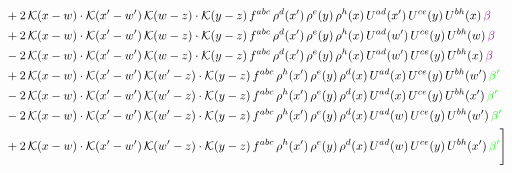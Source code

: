 \documentclass[9pt]{article}
\numberwithin{equation}{section}
\begin{document}
\begin{align}
&+2\,\mathcal{K}(x-w)\cdot\mathcal{K}(x'-w')\,\mathcal{K}(w-z)\cdot\mathcal{K}(y-z)\, f^{abc}\,\rho^{d}(x')\,\rho^{e}(y)\,\rho^{h}(x)\,U^{ad}(x')\,U^{ce}(y)\,U^{bh}(x)\,{\color{violet} \beta}\notag \\ & +2\,\mathcal{K}(x-w)\cdot\mathcal{K}(x'-w')\,\mathcal{K}(w-z)\cdot\mathcal{K}(y-z)\, f^{abc}\,\rho^{d}(x')\,\rho^{e}(y)\,\rho^{h}(x)\,U^{ad}(w')\,U^{ce}(y)\,U^{bh}(w)\,{\color{violet} \beta} \notag\\ & -2\,\mathcal{K}(x-w)\cdot\mathcal{K}(x'-w')\,\mathcal{K}(w-z)\cdot\mathcal{K}(y-z)\, f^{abc}\,\rho^{d}(x')\,\rho^{e}(y)\,\rho^{h}(x)\,U^{ad}(w')\,U^{ce}(y)\,U^{bh}(x)\,{\color{violet} \beta}\notag\\ & +2\,\mathcal{K}(x-w)\cdot\mathcal{K}(x'-w')\,\mathcal{K}(w'-z)\cdot\mathcal{K}(y-z)\, f^{abc}\,\rho^{h}(x')\,\rho^{e}(y)\,\rho^{d}(x)\,U^{ad}(x)\,U^{ce}(y)\,U^{bh}(w')\,{\color{green}\beta'}\notag \\ & -2\,\mathcal{K}(x-w)\cdot\mathcal{K}(x'-w')\,\mathcal{K}(w'-z)\cdot\mathcal{K}(y-z)\, f^{abc}\,\rho^{h}(x')\,\rho^{e}(y)\,\rho^{d}(x)\,U^{ad}(x)\,U^{ce}(y)\,U^{bh}(x')\,{\color{green}\beta'} \notag\\ & -2\,\mathcal{K}(x-w)\cdot\mathcal{K}(x'-w')\,\mathcal{K}(w'-z)\cdot\mathcal{K}(y-z)\, f^{abc}\,\rho^{h}(x')\,\rho^{e}(y)\,\rho^{d}(x)\,U^{ad}(w)\,U^{ce}(y)\,U^{bh}(w')\,{\color{green}\beta'} \notag\\ & +2\,\mathcal{K}(x-w)\cdot\mathcal{K}(x'-w')\,\mathcal{K}(w'-z)\cdot\mathcal{K}(y-z)\, f^{abc}\,\rho^{h}(x')\,\rho^{e}(y)\,\rho^{d}(x)\,U^{ad}(w)\,U^{ce}(y)\,U^{bh}(x')\,{\color{green}\beta'}\Bigg]
\end{align}
\end{document}
